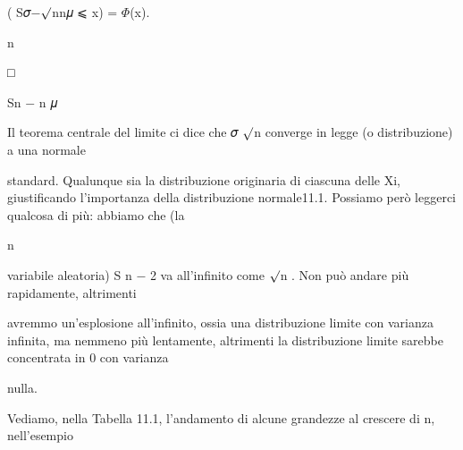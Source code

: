 \documentclass[a4paper,portrait,12pt]{article}
\begin{document}
\begin{flushleft}
( S𝜎$-$$\surd$nn𝜇 ⩽ x) = $\Phi$(x).
\end{flushleft}


\begin{flushleft}
n
\end{flushleft}





□


\begin{flushleft}
Sn $-$ n 𝜇
\end{flushleft}





\begin{flushleft}
Il teorema centrale del limite ci dice che 𝜎 $\surd$n converge in legge (o distribuzione) a una normale
\end{flushleft}


\begin{flushleft}
standard. Qualunque sia la distribuzione originaria di ciascuna delle Xi, giustificando l'importanza della distribuzione normale11.1. Possiamo per\`{o} leggerci qualcosa di più: abbiamo che (la
\end{flushleft}


\begin{flushleft}
n
\end{flushleft}


\begin{flushleft}
variabile aleatoria) S n $-$ 2 va all'infinito come $\surd$n . Non pu\`{o} andare più rapidamente, altrimenti
\end{flushleft}


\begin{flushleft}
avremmo un'esplosione all'infinito, ossia una distribuzione limite con varianza infinita, ma nemmeno più lentamente, altrimenti la distribuzione limite sarebbe concentrata in 0 con varianza
\end{flushleft}


\begin{flushleft}
nulla.
\end{flushleft}





\begin{flushleft}
Vediamo, nella Tabella 11.1, l'andamento di alcune grandezze al crescere di n, nell'esempio
\end{flushleft}
\end{document}
